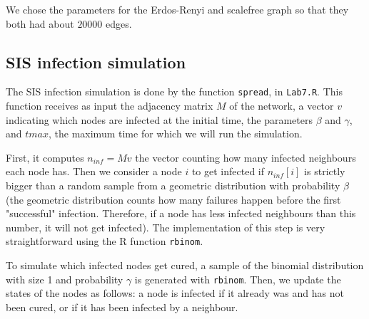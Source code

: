 \documentclass[paper=a4, fontsize=11pt]{scrartcl} %
\begin{document}
We chose the parameters for the Erdos-Renyi and scalefree graph so that they both had about $20000$ edges.

\subsection{SIS infection simulation}
The SIS infection simulation is done by the function \texttt{spread}, in \texttt{Lab7.R}. This function receives as input the adjacency matrix $M$ of the network, a vector $v$ indicating which nodes are infected at the initial time, the parameters $\beta$ and $\gamma$, and $tmax$, the maximum time for which we will run the simulation. 

First, it computes $n_{inf}=M v$ the vector counting how many infected neighbours each node has. Then we consider a node $i$ to get infected if $n_{inf}[i]$ is strictly bigger than a random sample from a geometric distribution with probability $\beta$ (the geometric distribution counts how many failures happen before the first "successful" infection. Therefore, if a node has less infected neighbours than this number, it will not get infected). The implementation of this step is very straightforward using the R function \texttt{rbinom}.

To simulate which infected nodes get cured, a sample of the binomial distribution with size 1 and probability $\gamma$ is generated with \texttt{rbinom}. Then, we update the states of the nodes as follows: a node is infected if it already was and has not been cured, or if it has been infected by a neighbour.
\end{document}
